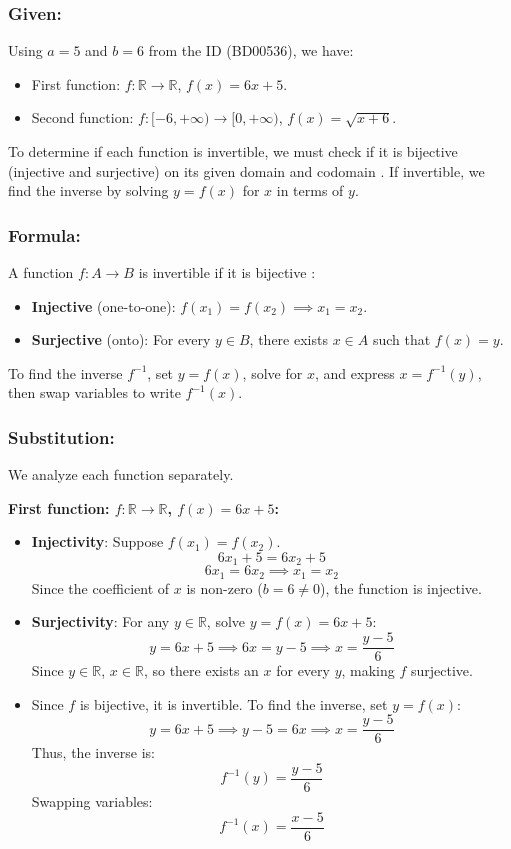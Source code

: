 \documentclass[12pt, a4paper, twoside]{report} %
\begin{document}
\subsubsection*{Given:}
Using \( a = 5 \) and \( b = 6 \) from the ID (BD00536), we have:
\begin{itemize}
  \item First function: \( f: \mathbb{R} \rightarrow \mathbb{R} \), \( f(x) = 6x + 5 \).
  \item Second function: \( f: [-6, +\infty) \rightarrow [0, +\infty) \), \( f(x) = \sqrt{x + 6} \).
\end{itemize}
To determine if each function is invertible, we must check if it is bijective (injective and surjective) on its given domain and codomain \cite{epp2020}. If invertible, we find the inverse by solving \( y = f(x) \) for \( x \) in terms of \( y \).

\subsubsection*{Formula:}
A function \( f: A \rightarrow B \) is invertible if it is bijective \cite{epp2020}:
\begin{itemize}
  \item \textbf{Injective} (one-to-one): \( f(x_1) = f(x_2) \implies x_1 = x_2 \).
  \item \textbf{Surjective} (onto): For every \( y \in B \), there exists \( x \in A \) such that \( f(x) = y \).
\end{itemize}
To find the inverse \( f^{-1} \), set \( y = f(x) \), solve for \( x \), and express \( x = f^{-1}(y) \), then swap variables to write \( f^{-1}(x) \).

\subsubsection*{Substitution:}
We analyze each function separately.

\textbf{First function: \( f: \mathbb{R} \rightarrow \mathbb{R} \), \( f(x) = 6x + 5 \):}
\begin{itemize}
  \item \textbf{Injectivity}: Suppose \( f(x_1) = f(x_2) \).
    \[
    6x_1 + 5 = 6x_2 + 5
    \]
    \[
    6x_1 = 6x_2 \implies x_1 = x_2
    \]
    Since the coefficient of \( x \) is non-zero (\( b = 6 \neq 0 \)), the function is injective.
  \item \textbf{Surjectivity}: For any \( y \in \mathbb{R} \), solve \( y = f(x) = 6x + 5 \):
    \[
    y = 6x + 5 \implies 6x = y - 5 \implies x = \frac{y - 5}{6}
    \]
    Since \( y \in \mathbb{R} \), \( x \in \mathbb{R} \), so there exists an \( x \) for every \( y \), making \( f \) surjective.
  \item Since \( f \) is bijective, it is invertible. To find the inverse, set \( y = f(x) \):
    \[
    y = 6x + 5 \implies y - 5 = 6x \implies x = \frac{y - 5}{6}
    \]
    Thus, the inverse is:
    \[
    f^{-1}(y) = \frac{y - 5}{6}
    \]
    Swapping variables:
    \[
    f^{-1}(x) = \frac{x - 5}{6}
    \]
\end{itemize}
\end{document}
